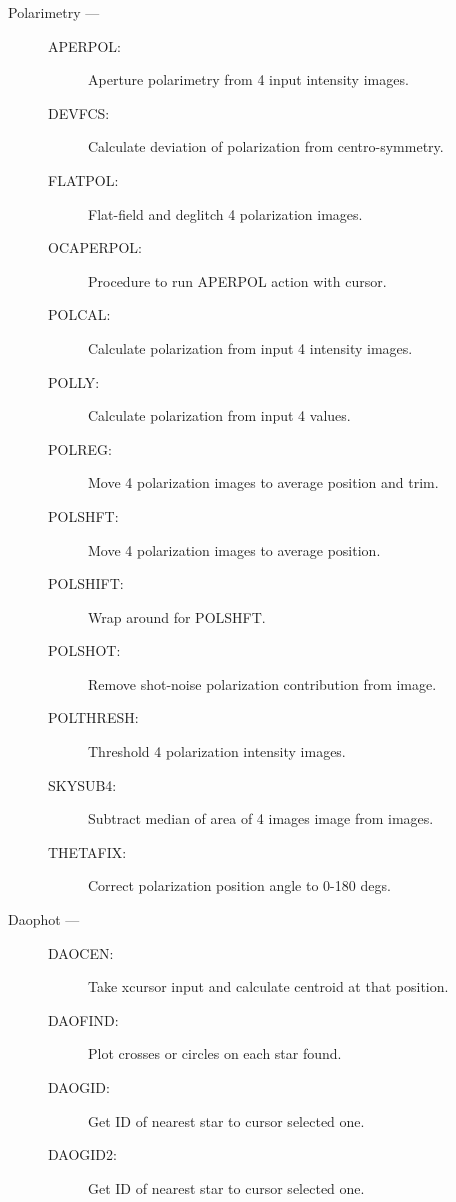 \begin{description}
\item [Polarimetry ---]
\begin{description}
\item [APERPOL:]  Aperture polarimetry from 4 input intensity images.
\item [DEVFCS:]  Calculate deviation of polarization from centro-symmetry.
\item [FLATPOL:]  Flat-field and deglitch 4 polarization images.
\item [OCAPERPOL:]  Procedure to run APERPOL action with cursor.
\item [POLCAL:]  Calculate polarization from input 4 intensity images.
\item [POLLY:]  Calculate polarization from input 4 values.
\item [POLREG:]  Move 4 polarization images to average position and trim.
\item [POLSHFT:]  Move 4 polarization images to average position.
\item [POLSHIFT:]  Wrap around for POLSHFT.
\item [POLSHOT:]  Remove shot-noise polarization contribution from image.
\item [POLTHRESH:]  Threshold 4 polarization intensity images.
\item [SKYSUB4:]  Subtract median of area of 4 images image from images.
\item [THETAFIX:]  Correct polarization position angle to 0-180 degs.
\end{description}

\item [Daophot ---]
\begin{description}
\item [DAOCEN:]  Take xcursor input and calculate centroid at that position.
\item [DAOFIND:]  Plot crosses or circles on each star found.
\item [DAOGID:]  Get ID of nearest star to cursor selected one.
\item [DAOGID2:]  Get ID of nearest star to cursor selected one.
\end{description}


\end{description}
